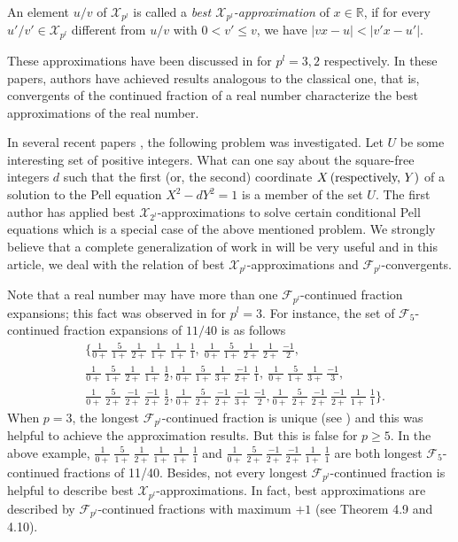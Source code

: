 \documentclass[12pt]{elsarticle}
\theoremstyle{definition}
\newcommand{\field}[1]{\mathbb{#1}}          \newcommand{\Q}{\field{Q}}
\newcommand{\R}{\field{R}}                   \newcommand{\Z}{\field{Z}}
\newcommand{\mX}{{\mathcal X}}
\newcommand{\f}{{\mathcal F}}
\begin{document}
 An element  $u/v$ of $\mX_{p^l}$ is called a \textit{best $\mX_{{p^l}}$-approximation} of $x\in\R$, if for every $u'/v'\in\mX_{{p^l}}$ different from $u/v$ with	$0< v' \le v$, we have $|vx-u|<|v'x-u'|$.  

These approximations have been discussed in \cite{seema2,seema} for $p^l=3,2$ respectively. In these papers, authors have achieved results analogous to the classical one, that is,  convergents of the continued fraction of a real number characterize the best approximations of the real number.

 In several recent papers \cite{lucax_tribnocci1,lucax_twofibonacci,primepowers,rep}, the following problem was investigated. Let $U$
be some interesting set of positive integers. What can one say about the
square-free integers $d$ such that the  first (or, the second) coordinate $X\,(\textnormal{respectively, }Y)$ of a solution to the Pell equation $X^2-dY^2=1$ is a member of the set $U$. The first author has applied best $\mX_{2^l}$-approximations to solve certain conditional Pell equations \cite{seema_pell} which is a special case of the above mentioned problem. We strongly believe that a complete generalization of work in \cite{seema2,seema} will be very useful and in this article, we deal with the relation of best $\mX_{p^l}$-approximations and $\f_{p^l}$-convergents.

Note that a real number may have more than one $\f_{p^l}$-continued fraction expansions; this fact was observed in \cite{seema2} for $p^l=3$. 
For instance, the set of $\f_5$-continued fraction expansions of $11/40$ is as follows
\begin{align*}
&	\Big\{\frac{1}{0+}~\frac{5}{1+}~\frac{1}{2+}~\frac{1}{1+}~\frac{1}{1+}~\frac{1}{1},~ \frac{1}{0+}~\frac{5}{1+}~\frac{1}{2+}~\frac{1}{2+}~\frac{-1}{2},~\\
&\frac{1}{0+}~\frac{5}{1+}~\frac{1}{2+}~\frac{1}{1+}~\frac{1}{2},
\frac{1}{0+}~\frac{5}{1+}~\frac{1}{3+}~\frac{-1}{2+}~\frac{1}{1},~\frac{1}{0+}~\frac{5}{1+}~\frac{1}{3+}~\frac{-1}{3},~\\ \tag*{(2)}\label{manyexpansions}
&\frac{1}{0+}~\frac{5}{2+}~\frac{-1}{2+}~\frac{-1}{2+}~\frac{1}{2}, \frac{1}{0+}~\frac{5}{2+}~\frac{-1}{2+}~\frac{-1}{3+}~\frac{-1}{2},
\frac{1}{0+}~\frac{5}{2+}~\frac{-1}{2+}~\frac{-1}{2+}~\frac{1}{1+}~\frac{1}{1}
\Big\}.
\end{align*}
When $p=3$, the longest $\f_{p^l}$-continued fraction is unique (see \cite{seema2}) and this was helpful to achieve the approximation results. But this is false for $p\ge5.$ In the above example,  $ \frac{1}{0+}~\frac{5}{1+}~\frac{1}{2+}~\frac{1}{1+}~\frac{1}{1+}~\frac{1}{1}$ and $	\frac{1}{0+}~\frac{5}{2+}~\frac{-1}{2+}~\frac{-1}{2+}~\frac{1}{1+}~\frac{1}{1} $ are both longest $\f_5$-continued fractions of 11/40.  Besides, not every longest $\f_{p^l}$-continued fraction is helpful to describe best $\mX_{p^l}$-approximations. In fact, best approximations are described by $\f_{p^l}$-continued fractions with maximum $+1$ (see Theorem 4.9 and 4.10).
\end{document}
